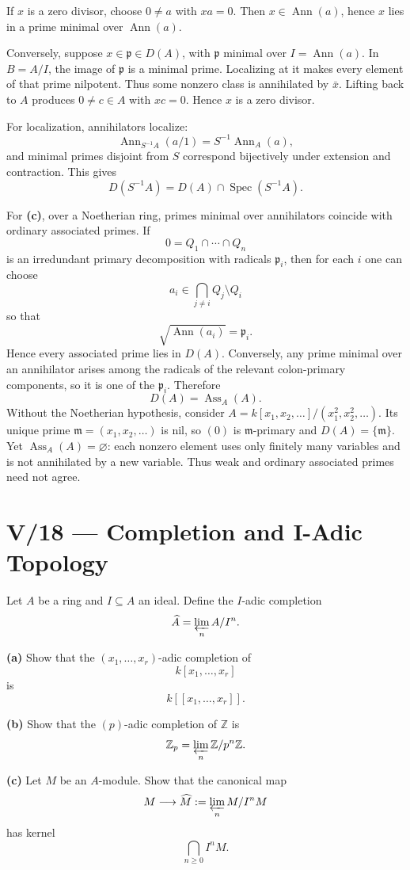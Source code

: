 \begin{solution}
If \(x\) is a zero divisor, choose \(0\ne a\) with \(xa=0\). Then
\(x\in\operatorname{Ann}(a)\), hence \(x\) lies in a prime minimal over
\(\operatorname{Ann}(a)\).

Conversely, suppose \(x\in\mathfrak p\in D(A)\), with \(\mathfrak p\)
minimal over \(I=\operatorname{Ann}(a)\). In \(B=A/I\), the image of
\(\mathfrak p\) is a minimal prime. Localizing at it makes every element of
that prime nilpotent. Thus some nonzero class is annihilated by \(\bar x\).
Lifting back to \(A\) produces \(0\ne c\in A\) with \(xc=0\). Hence \(x\) is
a zero divisor.

For localization, annihilators localize:
\[
\operatorname{Ann}_{S^{-1}A}(a/1)
=
S^{-1}\operatorname{Ann}_A(a),
\]
and minimal primes disjoint from \(S\) correspond bijectively under
extension and contraction. This gives
\[
D(S^{-1}A)=D(A)\cap\operatorname{Spec}(S^{-1}A).
\]

For \textbf{(c)}, over a Noetherian ring, primes minimal over
annihilators coincide with ordinary associated primes. If
\[
0=Q_1\cap\cdots\cap Q_n
\]
is an irredundant primary decomposition with radicals \(\mathfrak p_i\),
then for each \(i\)
one can choose
\[
a_i\in\bigcap_{j\ne i}Q_j\setminus Q_i
\]
so that
\[
\sqrt{\operatorname{Ann}(a_i)}=\mathfrak p_i.
\]
Hence every associated prime lies in \(D(A)\). Conversely, any prime minimal
over an annihilator arises among the radicals of the relevant colon-primary
components, so it is one of the \(\mathfrak p_i\). Therefore
\[
D(A)=\operatorname{Ass}_A(A).
\]
Without the Noetherian hypothesis, consider
\(A=k[x_1,x_2,\dots]/(x_1^2,x_2^2,\dots)\).
Its unique prime \(\mathfrak m=(x_1,x_2,\dots)\) is nil, so \((0)\)
is \(\mathfrak m\)-primary and \(D(A)=\{\mathfrak m\}\). Yet
\(\operatorname{Ass}_A(A)=\varnothing\): each nonzero element uses
only finitely many variables and is not annihilated by a new variable.
Thus weak and ordinary associated primes need not agree.
\end{solution}



\section*{V/18 --- Completion and I-Adic Topology}

\begin{problem}[CP-V-0030]
\label{prob:cp-v-0030}
Let \(A\) be a ring and \(I\subseteq A\) an ideal. Define the \(I\)-adic
completion
\[
\widehat A=\varprojlim_n A/I^n.
\]

\textbf{(a)} Show that the \((x_1,\dots,x_r)\)-adic completion of
\[
k[x_1,\dots,x_r]
\]
is
\[
k[[x_1,\dots,x_r]].
\]

\textbf{(b)} Show that the \((p)\)-adic completion of \(\mathbb Z\) is
\[
\mathbb Z_p=\varprojlim_n\mathbb Z/p^n\mathbb Z.
\]

\textbf{(c)} Let \(M\) be an \(A\)-module. Show that the canonical map
\[
M\longrightarrow\widehat M:=\varprojlim_n M/I^nM
\]
has kernel
\[
\bigcap_{n\ge0}I^nM.
\]
\end{problem}

